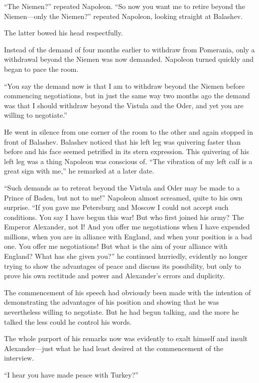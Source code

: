 ``The Niemen?'' repeated Napoleon. ``So now you want me to retire
beyond the Niemen---only the Niemen?'' repeated Napoleon, looking
straight at Balashev.

The latter bowed his head respectfully.

Instead of the demand of four months earlier to withdraw from
Pomerania, only a withdrawal beyond the Niemen was now
demanded. Napoleon turned quickly and began to pace the room.

``You say the demand now is that I am to withdraw beyond the
Niemen before commencing negotiations, but in just the same way
two months ago the demand was that I should withdraw beyond the
Vistula and the Oder, and yet you are willing to negotiate.''

He went in silence from one corner of the room to the other and
again stopped in front of Balashev. Balashev noticed that his
left leg was quivering faster than before and his face seemed
petrified in its stern expression. This quivering of his left leg
was a thing Napoleon was conscious of. ``The vibration of my left
calf is a great sign with me,'' he remarked at a later date.

``Such demands as to retreat beyond the Vistula and Oder may be
made to a Prince of Baden, but not to me!'' Napoleon almost
screamed, quite to his own surprise. ``If you gave me Petersburg
and Moscow I could not accept such conditions. You say I have
begun this war! But who first joined his army? The Emperor
Alexander, not I! And you offer me negotiations when I have
expended millions, when you are in alliance with England, and
when your position is a bad one. You offer me negotiations! But
what is the aim of your alliance with England? What has she given
you?'' he continued hurriedly, evidently no longer trying to show
the advantages of peace and discuss its possibility, but only to
prove his own rectitude and power and Alexander's errors and
duplicity.

The commencement of his speech had obviously been made with the
intention of demonstrating the advantages of his position and
showing that he was nevertheless willing to negotiate. But he had
begun talking, and the more he talked the less could he control
his words.

The whole purport of his remarks now was evidently to exalt
himself and insult Alexander---just what he had least desired at
the commencement of the interview.

``I hear you have made peace with Turkey?''

